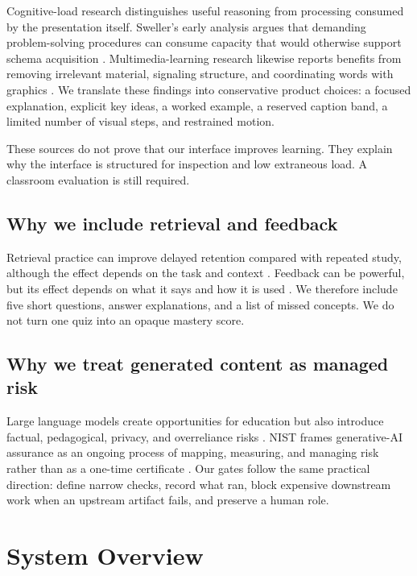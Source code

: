 \documentclass[11pt]{article}
\theoremstyle{plain}
\theoremstyle{definition}
\begin{document}
Cognitive-load research distinguishes useful reasoning from processing consumed by the presentation itself. Sweller's early analysis argues that demanding problem-solving procedures can consume capacity that would otherwise support schema acquisition \citep{sweller1988}. Multimedia-learning research likewise reports benefits from removing irrelevant material, signaling structure, and coordinating words with graphics \citep{mayer2009multimedia,mayer2021handbook}. We translate these findings into conservative product choices: a focused explanation, explicit key ideas, a worked example, a reserved caption band, a limited number of visual steps, and restrained motion.

These sources do not prove that our interface improves learning. They explain why the interface is structured for inspection and low extraneous load. A classroom evaluation is still required.

\subsection{Why we include retrieval and feedback}

Retrieval practice can improve delayed retention compared with repeated study, although the effect depends on the task and context \citep{roediger2006}. Feedback can be powerful, but its effect depends on what it says and how it is used \citep{hattie2007}. We therefore include five short questions, answer explanations, and a list of missed concepts. We do not turn one quiz into an opaque mastery score.

\subsection{Why we treat generated content as managed risk}

Large language models create opportunities for education but also introduce factual, pedagogical, privacy, and overreliance risks \citep{kasneci2023chatgpt}. NIST frames generative-AI assurance as an ongoing process of mapping, measuring, and managing risk rather than as a one-time certificate \citep{nist2024airmf}. Our gates follow the same practical direction: define narrow checks, record what ran, block expensive downstream work when an upstream artifact fails, and preserve a human role.

\section{System Overview}
\end{document}
